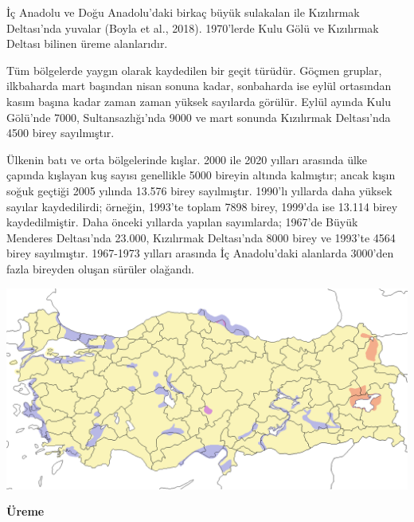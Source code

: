 \documentclass[
  a4paper,
  DIV=11,
  numbers=noendperiod]{scrartcl}
\begin{document}
İç Anadolu ve Doğu Anadolu'daki birkaç büyük sulakalan ile Kızılırmak
Deltası'nda yuvalar (Boyla et al., 2018). 1970'lerde Kulu Gölü ve
Kızılırmak Deltası bilinen üreme alanlarıdır.

Tüm bölgelerde yaygın olarak kaydedilen bir geçit türüdür. Göçmen
gruplar, ilkbaharda mart başından nisan sonuna kadar, sonbaharda ise
eylül ortasından kasım başına kadar zaman zaman yüksek sayılarda
görülür. Eylül ayında Kulu Gölü'nde 7000, Sultansazlığı'nda 9000 ve mart
sonunda Kızılırmak Deltası'nda 4500 birey sayılmıştır.

Ülkenin batı ve orta bölgelerinde kışlar. 2000 ile 2020 yılları arasında
ülke çapında kışlayan kuş sayısı genellikle 5000 bireyin altında
kalmıştır; ancak kışın soğuk geçtiği 2005 yılında 13.576 birey
sayılmıştır. 1990'lı yıllarda daha yüksek sayılar kaydedilirdi; örneğin,
1993'te toplam 7898 birey, 1999'da ise 13.114 birey kaydedilmiştir. Daha
önceki yıllarda yapılan sayımlarda; 1967'de Büyük Menderes Deltası'nda
23.000, Kızılırmak Deltası'nda 8000 birey ve 1993'te 4564 birey
sayılmıştır. 1967-1973 yılları arasında İç Anadolu'daki alanlarda
3000'den fazla bireyden oluşan sürüler olağandı.

\includegraphics{images/harita_Spatula clypeata.png}

\textbf{Üreme}
\end{document}
